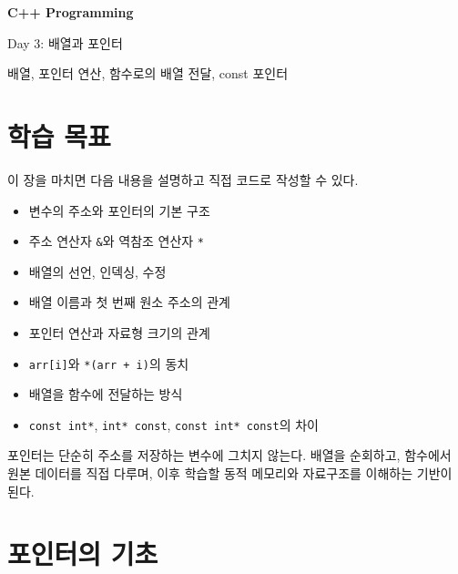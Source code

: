 \documentclass[11pt,a4paper]{article}
\begin{document}
\begin{titlepage}
    \centering
    \vspace*{3cm}

    {\Huge\bfseries C++ Programming\par}
    \vspace{0.8cm}
    {\LARGE Day 3: 배열과 포인터\par}

    \vspace{2cm}

    {\large 배열, 포인터 연산, 함수로의 배열 전달, const 포인터\par}

    \vfill
\end{titlepage}

\tableofcontents
\newpage

\section{학습 목표}

\begin{learningbox}
이 장을 마치면 다음 내용을 설명하고 직접 코드로 작성할 수 있다.
\begin{itemize}[leftmargin=1.5em]
    \item 변수의 주소와 포인터의 기본 구조
    \item 주소 연산자 \texttt{\&}와 역참조 연산자 \texttt{*}
    \item 배열의 선언, 인덱싱, 수정
    \item 배열 이름과 첫 번째 원소 주소의 관계
    \item 포인터 연산과 자료형 크기의 관계
    \item \texttt{arr[i]}와 \texttt{*(arr + i)}의 동치
    \item 배열을 함수에 전달하는 방식
    \item \texttt{const int*}, \texttt{int* const}, \texttt{const int* const}의 차이
\end{itemize}
\end{learningbox}

포인터는 단순히 주소를 저장하는 변수에 그치지 않는다. 배열을 순회하고, 함수에서 원본 데이터를 직접 다루며, 이후 학습할 동적 메모리와 자료구조를 이해하는 기반이 된다.

\section{포인터의 기초}
\end{document}
